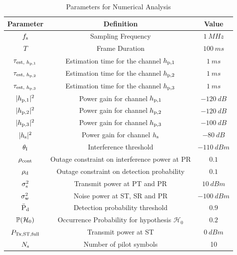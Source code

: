 \begin{table}
\renewcommand{\arraystretch}{1.2}
\caption{Parameters for Numerical Analysis}
\vspace{-0.3cm}
\label{tb:tb2}
\centering
\scriptsize{
\begin{tabular}{c||c|c}
\hline
\bfseries Parameter & \bfseries Definition & \bfseries Value \\
\hline\hline
$f_{\text{s}}$ & Sampling Frequency & $\SI{1}{MHz}$ \\ 
$T$ & Frame Duration & $\SI{100}{ms}$ \\ 
$\tau_{\text{est, $h_{\text{p,1}}$}}$ & Estimation time for the channel $h_{\text{p,1}}$ & $\SI{1}{ms}$ \\
$\tau_{\text{est, $h_{\text{p,2}}$}}$ & Estimation time for the channel $h_{\text{p,2}}$ & $\SI{1}{ms}$ \\
$\tau_{\text{est, $h_{\text{p,3}}$}}$ & Estimation time for the channel $h_{\text{p,3}}$ & $\SI{1}{ms}$ \\
$|h_{\text{p,1}}|^2$ & Power gain for channel $h_{\text{p,1}}$ & $\SI{-120}{dB}$ \\ 
$|h_{\text{p,2}}|^2$ & Power gain for channel $h_{\text{p,2}}$ & $\SI{-120}{dB}$ \\ 
$|h_{\text{p,3}}|^2$ & Power gain for channel $h_{\text{p,3}}$ &$\SI{-100}{dB}$ \\ 
$|h_{\text{s}}|^2$ & Power gain for channel $h_{\text{s}}$ &$\SI{-80}{dB}$ \\ 
$\theta_{\text{I}}$ & Interference threshold &$\SI{-110}{dBm}$ \\ 
$\rho_{\text{cont}}$ & Outage constraint on interference power at PR& $0.1$ \\
$\rho_{\text{d}}$ & Outage constraint on detection probability & $0.1$ \\
$\sigma^2_{\text{s}}$ & Transmit power at PT and PR&$\SI{10}{dBm}$ \\
$\sigma^2_{\text{w}}$ & Noise power at ST, SR and PR &$\SI{-100}{dBm}$ \\
$\bar{\text{P}}_{\text{d}}$ & Detection probability threshold  &$0.9$ \\
$\mathbb P(\mathcal{H}_0)$ & Occurrence Probability for hypothesis $\mathcal H_0$ & $0.2$ \\
$P_{\text{Tx,ST,full}}$ & Transmit power at ST &$\SI{0}{dBm}$ \\
$N_{\text{s}}$ & Number of pilot symbols & 10 \\ \hline
\end{tabular}}
\vspace{-4.0mm}
\end{table}

